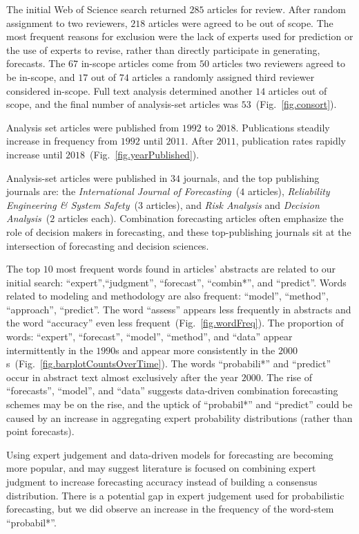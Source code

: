 \documentclass[preprint,authoryear]{elsarticle}
\begin{document}
The initial Web of Science search returned $285$ articles for review.
After random assignment to two reviewers, $218$ articles were agreed  to be out of scope. 
The most frequent reasons for exclusion were the lack of experts used for prediction or the use of experts to revise, rather than directly participate in generating, forecasts.
The $67$ in-scope articles come from $50$ articles two reviewers agreed to be in-scope, and $17$ out of $74$ articles a randomly assigned third reviewer considered in-scope.
Full text analysis determined another $14$ articles out of scope, and the final number of analysis-set articles was $53$~(Fig.~\ref{fig.consort}).

Analysis set articles were published from $1992$ to $2018$.
Publications steadily increase in frequency from $1992$ until $2011$.
After $2011$, publication rates rapidly increase until $2018$~(Fig.~\ref{fig.yearPublished}).

Analysis-set articles were published in $34$ journals, and the top publishing journals are: the \textit{International Journal of Forecasting}~($4$ articles), \textit{Reliability Engineering \& System Safety}~($3$ articles), and \textit{Risk Analysis} and \textit{Decision Analysis}~($2$ articles each).
Combination forecasting articles often emphasize the role of decision makers in forecasting, and
these top-publishing journals sit at the intersection of forecasting and decision sciences.

The top $10$ most frequent words found in articles' abstracts are related to our initial search: ``expert'',``judgment'', ``forecast'', ``combin*'', and ``predict''.
Words related to modeling and methodology are also frequent: ``model'', ``method'', ``approach'', ``predict''.
The word ``assess'' appears less frequently in abstracts and the word ``accuracy'' even less frequent~(Fig.~\ref{fig.wordFreq}).
%
The proportion of words: ``expert'', ``forecast'', ``model'', ``method'', and ``data'' appear intermittently in the $1990$s and appear more consistently in the $2000$s~(Fig.~\ref{fig.barplotCountsOverTime}).
The words ``probabili*'' and ``predict'' occur in abstract text almost exclusively after the year $2000$.
The rise of ``forecasts'', ``model'', and ``data'' suggests data-driven combination forecasting schemes may be on the rise, and the uptick of ``probabil*'' and ``predict'' could be caused by an increase in aggregating expert probability distributions (rather than point forecasts).

Using expert judgement and data-driven models for forecasting are becoming more popular, and may suggest literature is focused on combining expert judgment to increase forecasting accuracy instead of building a consensus distribution.
There is a potential gap in expert judgement used for probabilistic forecasting, but we did observe an increase in the frequency of the word-stem ``probabil*''.
\end{document}
